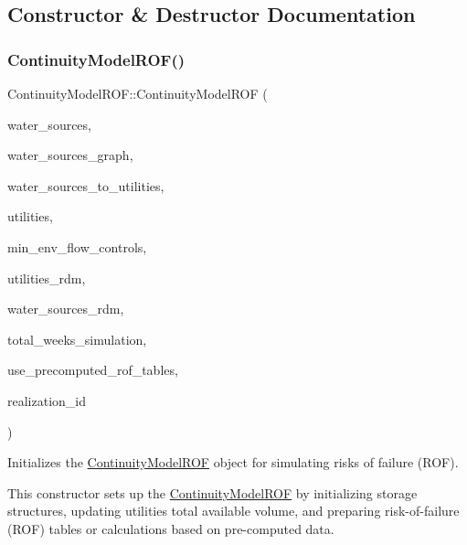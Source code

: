 \subsection{Constructor \& Destructor Documentation}
\mbox{\label{classContinuityModelROF_a23bd422349e4e2246bd44b2007564fd1}} 
\subsubsection{\texorpdfstring{Continuity\+Model\+R\+O\+F()}{ContinuityModelROF()}}
{\footnotesize\ttfamily Continuity\+Model\+R\+O\+F\+::\+Continuity\+Model\+R\+OF (\begin{DoxyParamCaption}\item[{vector$<$ \mbox{\hyperlink{classWaterSource}{Water\+Source}} $\ast$$>$}]{water\+\_\+sources,  }\item[{const Graph \&}]{water\+\_\+sources\+\_\+graph,  }\item[{const vector$<$ vector$<$ int $>$$>$ \&}]{water\+\_\+sources\+\_\+to\+\_\+utilities,  }\item[{vector$<$ \mbox{\hyperlink{classUtility}{Utility}} $\ast$$>$}]{utilities,  }\item[{vector$<$ Min\+Env\+Flow\+Control $\ast$$>$}]{min\+\_\+env\+\_\+flow\+\_\+controls,  }\item[{vector$<$ double $>$ \&}]{utilities\+\_\+rdm,  }\item[{vector$<$ double $>$ \&}]{water\+\_\+sources\+\_\+rdm,  }\item[{unsigned long}]{total\+\_\+weeks\+\_\+simulation,  }\item[{const int}]{use\+\_\+precomputed\+\_\+rof\+\_\+tables,  }\item[{const unsigned long}]{realization\+\_\+id }\end{DoxyParamCaption})}



Initializes the \mbox{\hyperlink{classContinuityModelROF}{Continuity\+Model\+R\+OF}} object for simulating risks of failure (R\+OF). 

This constructor sets up the \mbox{\hyperlink{classContinuityModelROF}{Continuity\+Model\+R\+OF}} by initializing storage structures, updating utilities\textquotesingle{} total available volume, and preparing risk-\/of-\/failure (R\+OF) tables or calculations based on pre-\/computed data.


